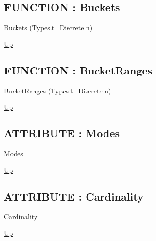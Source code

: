 \par
\par
\subsection*{FUNCTION : Buckets}
\hypertarget{ecldoc:ml_core.fieldaggregates.buckets}{}
\begin{minipage}[t]{\textwidth}
\begin{flushleft}
 Buckets (Types.t\_Discrete n)
\end{flushleft}
\end{minipage}
\hyperlink{ecldoc:ml_core.fieldaggregates}{Up}

\par
\par
\subsection*{FUNCTION : BucketRanges}
\hypertarget{ecldoc:ml_core.fieldaggregates.bucketranges}{}
\begin{minipage}[t]{\textwidth}
\begin{flushleft}
 BucketRanges (Types.t\_Discrete n)
\end{flushleft}
\end{minipage}
\hyperlink{ecldoc:ml_core.fieldaggregates}{Up}

\par
\par
\subsection*{ATTRIBUTE : Modes}
\hypertarget{ecldoc:ml_core.fieldaggregates.modes}{}
\begin{minipage}[t]{\textwidth}
\begin{flushleft}
 Modes 
\end{flushleft}
\end{minipage}
\hyperlink{ecldoc:ml_core.fieldaggregates}{Up}

\par
\par
\subsection*{ATTRIBUTE : Cardinality}
\hypertarget{ecldoc:ml_core.fieldaggregates.cardinality}{}
\begin{minipage}[t]{\textwidth}
\begin{flushleft}
 Cardinality 
\end{flushleft}
\end{minipage}
\hyperlink{ecldoc:ml_core.fieldaggregates}{Up}

